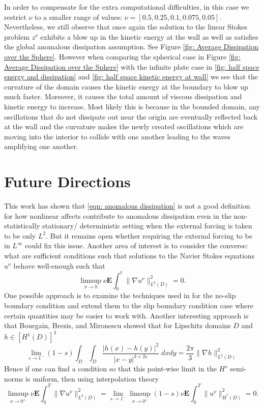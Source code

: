 \documentclass[11pt, reqno]{article}
\def\grad{\nabla}
\def\E{\mathbf{E}}
\begin{document}
In order to compensate for the extra computational difficulties, in this case we restrict $\nu$ to a smaller range of values: $\nu = [0.5, 0.25, 0.1, 0.075, 0.05]$. Nevertheless, we still observe that once again the solution to the linear Stokes problem $z^\nu$ exhibits a blow up in the kinetic energy at the wall as well as satisfies the global anomalous dissipation assumption. See Figure \ref{fig: Average Dissipation over the Sphere}. However when comparing the spherical case in Figure \ref{fig: Average Dissipation over the Sphere} with the infinite plate case in \ref{fig: half space energy and dissipation} and \ref{fig: half space kinetic energy at wall} we see that the curvature of the domain causes the kinetic energy at the boundary to blow up much faster. Moreover, it causes the total amount of viscous dissipation and kinetic energy to increase. Most likely this is because in the bounded domain, any oscillations that do not dissipate out near the origin are eventually reflected back at the wall and the curvature makes the newly created oscillations which are moving into the interior to collide with one another leading to the waves amplifying one another.   


\section{Future Directions}
This work has shown that \eqref{eqn: anomalous dissipation} is not a good definition for how nonlinear affects contribute to anomalous dissipation even in the non-statistically stationary/ deterministic setting when the external forcing is taken to be only $L^2$. But it remains open whether requiring the external forcing to be in $L^\infty$ could fix this issue. Another area of interest is to consider the converse: what are sufficient conditions such that solutions to the Navier Stokes equations $u^\nu$ behave well-enough such that
\[
    \limsup_{\nu \to 0}\nu\E\int_0^t\|\grad u^\nu\|_{L^2(D)}^2 = 0.
\]
One possible approach is to examine the techniques used in \cite{drivas2018onsager} for the no-slip boundary condition and extend them to the slip boundary condition case where certain quantities may be easier to work with. Another interesting approach is that Bourgain, Brezis, and Mironescu showed that for Lipschitz domains $D$ and $h \in [H^1(D)]^3$
\[
    \lim_{s \to 1^-}(1-s)\int_D \int_D \frac{|h(x) - h(y)|^2}{|x-y|^{3+2s}}\;dxdy = \frac{2\pi}{3}\|\grad h\|_{L^2(D)}^2
\]
Hence if one can find a condition so that this point-wise limit in the $H^s$ semi-norms is uniform, then using interpolation theory
\[
    \limsup_{\nu \to 0^+}\nu\E\int_0^T\|\grad u^\nu\|_{L^2(D)}^2 = \lim_{s\to 1^-}\limsup_{\nu \to 0^+}(1-s)\nu\E\int_0^T\|u^\nu\|_{\dot{H}^s(D)}^2 = 0.
\]
\end{document}

